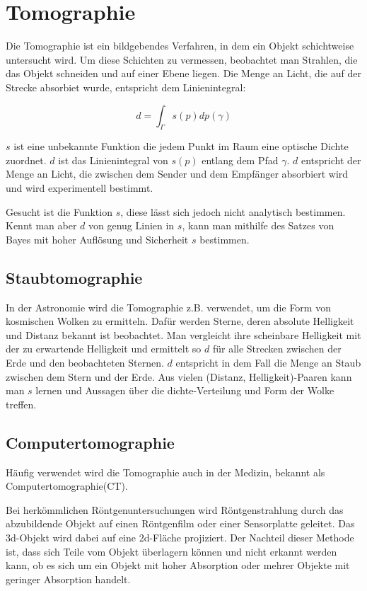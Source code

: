 \section{Tomographie}\label{k4.2.comptomo.ct}

Die Tomographie ist ein bildgebendes Verfahren, in dem ein Objekt schichtweise untersucht wird. Um diese Schichten zu vermessen, beobachtet man Strahlen, die das Objekt schneiden und auf einer Ebene liegen. Die Menge an Licht, die auf der Strecke absorbiet wurde, entspricht dem Linienintegral:

$$d=\int_{\Gamma}{}s(p)dp(\gamma)$$

$s$ ist eine unbekannte Funktion die jedem Punkt im Raum eine optische Dichte zuordnet. $d$ ist das Linienintegral von $s(p)$ entlang dem Pfad $\gamma$. $d$ entspricht der Menge an Licht, die zwischen dem Sender und dem Empfänger absorbiert wird und wird experimentell bestimmt.

Gesucht ist die Funktion $s$, diese lässt sich jedoch nicht analytisch bestimmen. Kennt man aber $d$ von genug Linien in $s$, kann man mithilfe des Satzes von Bayes mit hoher Auflösung und Sicherheit $s$ bestimmen.

\subsection{Staubtomographie}

In der Astronomie wird die Tomographie z.B. verwendet, um die Form von kosmischen Wolken zu ermitteln. Dafür werden Sterne, deren absolute Helligkeit und Distanz bekannt ist beobachtet. Man vergleicht ihre scheinbare Helligkeit mit der zu erwartende Helligkeit und ermittelt so $d$ für alle Strecken zwischen der Erde und den beobachteten Sternen. $d$ entspricht in dem Fall die Menge an Staub zwischen dem Stern und der Erde. Aus vielen (Distanz, Helligkeit)-Paaren kann man $s$ lernen und Aussagen über die dichte-Verteilung und Form der Wolke treffen.

\subsection{Computertomographie}\label{k4.2.comptomo}

Häufig verwendet wird die Tomographie auch in der Medizin, bekannt als Computertomographie(CT).

Bei herkömmlichen Röntgenuntersuchungen wird Röntgenstrahlung durch das abzubildende Objekt auf einen Röntgenfilm oder einer Sensorplatte geleitet. Das 3d-Objekt wird dabei auf eine 2d-Fläche projiziert. Der Nachteil dieser Methode ist, dass sich Teile vom Objekt überlagern können und nicht erkannt werden kann, ob es sich um ein Objekt mit hoher Absorption oder mehrer Objekte mit geringer Absorption handelt.

